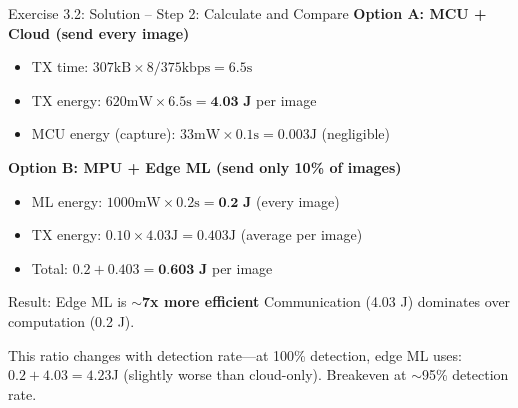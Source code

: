 \documentclass[aspectratio=169,11pt]{beamer}
\begin{document}
\begin{frame}{Exercise 3.2: Solution -- Step 2: Calculate and Compare}
    \textbf{Option A: MCU + Cloud (send every image)}
    \begin{itemize}
        \item TX time: $307\text{kB} \times 8 / 375\text{kbps} = 6.5\text{s}$
        \item TX energy: $620\text{mW} \times 6.5\text{s} = \textbf{4.03 J}$ per image
        \item MCU energy (capture): $33\text{mW} \times 0.1\text{s} = 0.003\text{J}$ (negligible)
    \end{itemize}
    
    \vspace{0.2cm}
    \textbf{Option B: MPU + Edge ML (send only 10\% of images)}
    \begin{itemize}
        \item ML energy: $1000\text{mW} \times 0.2\text{s} = \textbf{0.2 J}$ (every image)
        \item TX energy: $0.10 \times 4.03\text{J} = 0.403\text{J}$ (average per image)
        \item Total: $0.2 + 0.403 = \textbf{0.603 J}$ per image
    \end{itemize}
    
    \vspace{0.2cm}
    \begin{exampleblock}{Result: Edge ML is $\sim$\textbf{7x more efficient}}
        Communication (4.03 J) dominates over computation (0.2 J).
        
        \vspace{0.1cm}
        This ratio changes with detection rate---at 100\% detection, edge ML uses: $0.2 + 4.03 = 4.23$J (slightly worse than cloud-only). Breakeven at $\sim$95\% detection rate.
    \end{exampleblock}
\end{frame}
\end{document}
